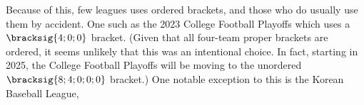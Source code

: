 {

Because of this, few leagues uses ordered brackets, and those who do usually use them by accident. One such as the 2023 College Football Playoffs which uses a $\bracksig{4; 0; 0}$ bracket. (Given that all four-team proper brackets are ordered, it seems unlikely that this was an intentional choice. In fact, starting in 2025, the College Football Playoffs will be moving to the unordered $\bracksig{8; 4; 0; 0; 0}$ bracket.) One notable exception to this is the Korean Baseball League,
}